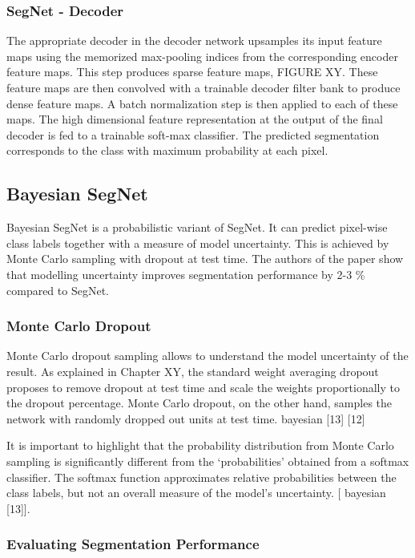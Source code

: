 \subsubsection{SegNet - Decoder}

The appropriate decoder in the decoder network upsamples its input feature maps using the memorized max-pooling indices from the corresponding encoder feature maps. This step produces sparse feature maps, FIGURE XY. These feature maps are then convolved with a trainable decoder filter bank to produce dense feature maps. A batch normalization step is then applied to each of these maps. The high dimensional feature representation at the output of the final decoder is fed to a trainable soft-max classifier. The predicted segmentation corresponds to the class with maximum probability at each pixel.

\subsection{Bayesian SegNet}

Bayesian SegNet is a probabilistic variant of SegNet. It can predict pixel-wise class labels together with a measure of model uncertainty.  This is achieved by Monte Carlo sampling with dropout at test time. The authors of the paper show that modelling uncertainty improves segmentation performance by 2-3 \% compared to SegNet.

\subsubsection{Monte Carlo Dropout}

Monte Carlo dropout sampling allows to understand the model uncertainty of the result. As explained in Chapter XY, the standard weight averaging dropout proposes to remove dropout at test time and scale the weights proportionally to the dropout percentage. Monte Carlo dropout, on the other hand, samples the network with randomly dropped out units at test time. bayesian [13] [12]

It is important to highlight that the probability distribution from Monte Carlo sampling is significantly different from the ‘probabilities’ obtained from a softmax classifier. The softmax function approximates relative probabilities between the class labels, but not an overall measure of the model’s uncertainty. [ bayesian [13]].

\subsubsection{Evaluating Segmentation Performance}

